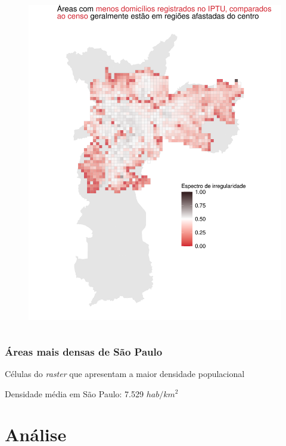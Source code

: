 \documentclass[%
    9pt, 
    aspectratio=169,
]{beamer}
\begin{document}
\begin{frame}
\begin{columns}[T]
        \begin{figure}
            \centering
            \includegraphics[width = \linewidth]{imagens/balanco_raster.pdf}
        \end{figure}
    \end{columns}
\end{frame}

\begin{frame}
    \frametitle{Áreas mais densas de São Paulo}

    \begin{table}
        \fontsize{4pt}{10}
        \caption{Células do \textit{raster} que apresentam a maior densidade populacional}
        
        \addtocounter{table}{-1}
    \end{table}

    Densidade média em São Paulo: 7.529 $hab/km^2$
\end{frame}

\section{Análise}
\end{document}
